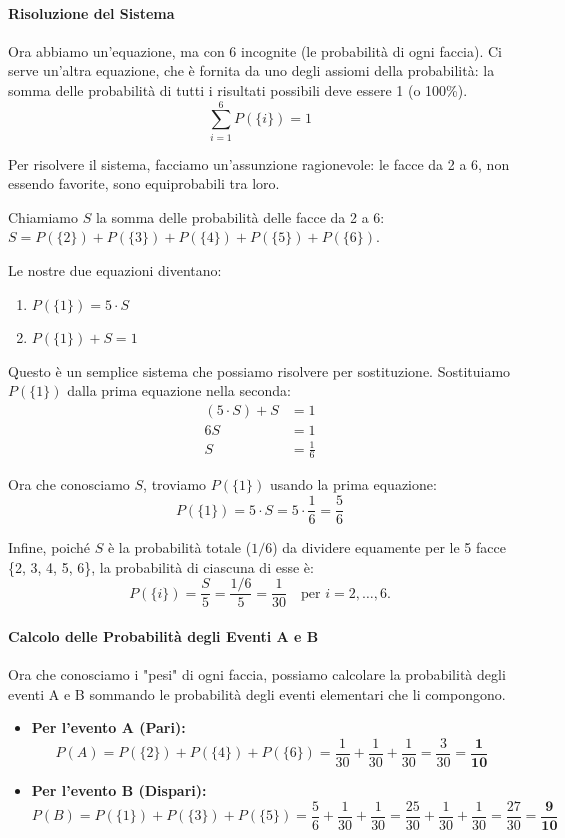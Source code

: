 \begin{esempio}
\paragraph{Risoluzione del Sistema}
Ora abbiamo un'equazione, ma con 6 incognite (le probabilità di ogni faccia). Ci serve un'altra equazione, che è fornita da uno degli assiomi della probabilità: la somma delle probabilità di tutti i risultati possibili deve essere 1 (o 100\%).
\[ \sum_{i=1}^{6} P(\{i\}) = 1 \]

Per risolvere il sistema, facciamo un'assunzione ragionevole: le facce da 2 a 6, non essendo favorite, sono equiprobabili tra loro.

Chiamiamo \(S\) la somma delle probabilità delle facce da 2 a 6: \( S = P(\{2\}) + P(\{3\}) + P(\{4\}) + P(\{5\}) + P(\{6\}) \).

Le nostre due equazioni diventano:
\begin{enumerate}
    \item \( P(\{1\}) = 5 \cdot S \)
    \item \( P(\{1\}) + S = 1 \)
\end{enumerate}

Questo è un semplice sistema che possiamo risolvere per sostituzione. Sostituiamo \(P(\{1\})\) dalla prima equazione nella seconda:
\begin{align*}
(5 \cdot S) + S &= 1 \\
6S &= 1 \\
S &= \frac{1}{6}
\end{align*}

Ora che conosciamo \(S\), troviamo \(P(\{1\})\) usando la prima equazione:
\[ P(\{1\}) = 5 \cdot S = 5 \cdot \frac{1}{6} = \frac{5}{6} \]

Infine, poiché \(S\) è la probabilità totale (\(1/6\)) da dividere equamente per le 5 facce \{2, 3, 4, 5, 6\}, la probabilità di ciascuna di esse è:
\[ P(\{i\}) = \frac{S}{5} = \frac{1/6}{5} = \frac{1}{30} \quad \text{per } i = 2, \dots, 6. \]

\paragraph{Calcolo delle Probabilità degli Eventi A e B}
Ora che conosciamo i "pesi" di ogni faccia, possiamo calcolare la probabilità degli eventi A e B sommando le probabilità degli eventi elementari che li compongono.

\begin{itemize}
    \item \textbf{Per l'evento A (Pari):}
    \[
    P(A) = P(\{2\}) + P(\{4\}) + P(\{6\}) = \frac{1}{30} + \frac{1}{30} + \frac{1}{30} = \frac{3}{30} = \mathbf{\frac{1}{10}}
    \]
    
    \item \textbf{Per l'evento B (Dispari):}
    \[
    P(B) = P(\{1\}) + P(\{3\}) + P(\{5\}) = \frac{5}{6} + \frac{1}{30} + \frac{1}{30} = \frac{25}{30} + \frac{1}{30} + \frac{1}{30} = \frac{27}{30} = \mathbf{\frac{9}{10}}
    \]
\end{itemize}
\end{esempio}

